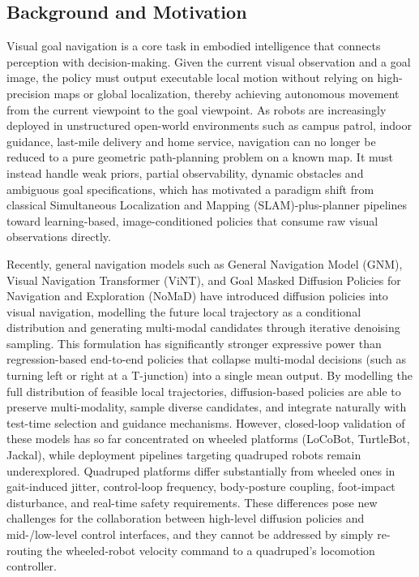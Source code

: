 \begin{digest}[en]

\subsection*{Background and Motivation}

Visual goal navigation is a core task in embodied intelligence that connects perception
with decision-making. Given the current visual observation and a goal image, the policy
must output executable local motion without relying on high-precision maps or global
localization, thereby achieving autonomous movement from the current viewpoint to the
goal viewpoint. As robots are increasingly deployed in unstructured open-world
environments such as campus patrol, indoor guidance, last-mile delivery and home
service, navigation can no longer be reduced to a pure geometric path-planning problem
on a known map. It must instead handle weak priors, partial observability, dynamic
obstacles and ambiguous goal specifications, which has motivated a paradigm shift from
classical Simultaneous Localization and Mapping (SLAM)-plus-planner pipelines toward learning-based, image-conditioned policies
that consume raw visual observations directly.

Recently, general navigation models such as General Navigation Model (GNM), Visual Navigation Transformer (ViNT), and Goal Masked Diffusion Policies for Navigation and Exploration (NoMaD) have introduced
diffusion policies into visual navigation, modelling the future local trajectory as a
conditional distribution and generating multi-modal candidates through iterative
denoising sampling. This formulation has significantly stronger expressive power than
regression-based end-to-end policies that collapse multi-modal decisions (such as
turning left or right at a T-junction) into a single mean output. By modelling the
full distribution of feasible local trajectories, diffusion-based policies are able to
preserve multi-modality, sample diverse candidates, and integrate naturally with
test-time selection and guidance mechanisms. However, closed-loop validation of these
models has so far concentrated on wheeled platforms (LoCoBot, TurtleBot, Jackal),
while deployment pipelines targeting quadruped robots remain underexplored. Quadruped
platforms differ substantially from wheeled ones in gait-induced jitter, control-loop
frequency, body-posture coupling, foot-impact disturbance, and real-time safety
requirements. These differences pose new challenges for the collaboration between
high-level diffusion policies and mid-/low-level control interfaces, and they cannot
be addressed by simply re-routing the wheeled-robot velocity command to a quadruped's
locomotion controller.


\end{digest}
